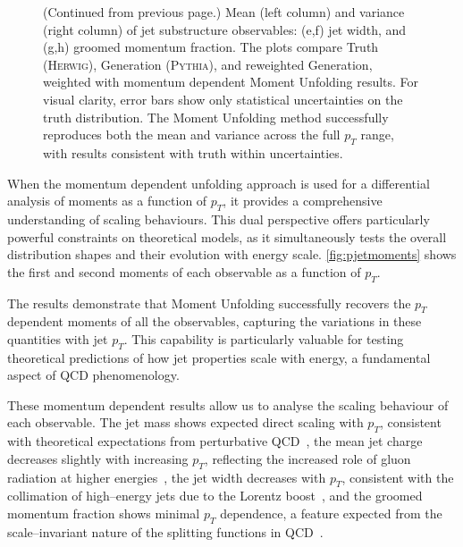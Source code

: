 \begin{figure}
{    \label{fig:pzgjetvar}}
    \caption[]{(Continued from previous page.) Mean (left column) and variance (right column) of jet substructure observables: (e,f) jet width, and (g,h) groomed momentum fraction. The plots compare Truth (\textsc{Herwig}), Generation (\textsc{Pythia}), and reweighted Generation, weighted with momentum dependent Moment Unfolding results. For visual clarity, error bars show only statistical uncertainties on the truth distribution. The Moment Unfolding method successfully reproduces both the mean and variance across the full $p_T$ range, with results consistent with truth within uncertainties.}
\end{figure}

            When the momentum dependent unfolding approach is used for a differential analysis of moments as a function of \(p_T\), it provides a comprehensive understanding of scaling behaviours.
            This dual perspective offers particularly powerful constraints on theoretical models, as it simultaneously tests the overall distribution shapes and their evolution with energy scale.
            \cref{fig:pjetmoments} shows the first and second moments of each observable as a function of $p_T$.

            The results demonstrate that Moment Unfolding successfully recovers the $p_T$ dependent moments of all the observables, capturing the variations in these quantities with jet \(p_T\).
            This capability is particularly valuable for testing theoretical predictions of how jet properties scale with energy, a fundamental aspect of QCD phenomenology.

            These momentum dependent results allow us to analyse the scaling behaviour of each observable.
            The jet mass shows expected direct scaling with $p_T$, consistent with theoretical expectations from perturbative QCD~\cite{ManganoINTRODUCTIONQCD, ParticleDataGroup:2020ssz, Czakon:2021mjy, CMS:2019fak, ALICE:2020pga, kogler_jet_2019, ALICE:2021njq, Dasgupta:2022fim, ATLAS:2014bjq},
            the mean jet charge decreases slightly with increasing $p_T$, reflecting the increased role of gluon radiation at higher energies~\cite{ATLAS:2015rlw, CMS:2017yer, Li:2019dre},
            the jet width decreases with $p_T$, consistent with the collimation of high--energy jets due to the Lorentz boost~\cite{ATLAS:2014hvo, ATLAS:2011lgt}, and
            the groomed momentum fraction shows minimal $p_T$ dependence, a feature expected from the scale--invariant nature of the splitting functions in QCD~\cite{ATLAS:2020bbn, CMS:2020poo, ATLASCollaboration2025ElectroweakLHC}.

